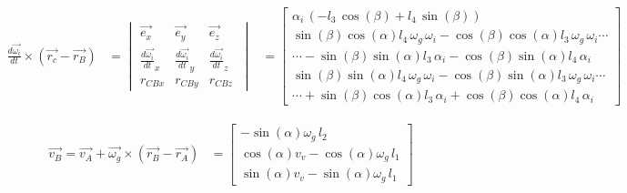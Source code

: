 \begin{equation*}
\begin{split}
\frac{d\overrightarrow{\omega_i}}{dt}\times(\overrightarrow{r_{c}}-\overrightarrow{r_{B}})
&=	\begin{vmatrix}
	\overrightarrow{e_{x}} & \overrightarrow{e_{y}} & \overrightarrow{e_{z}}\\
	\frac{d\overrightarrow{\omega_i}}{dt}_{x} & \frac{d\overrightarrow{\omega_i}}{dt}_{y} & \frac{d\overrightarrow{\omega_i}}{dt}_{z}\\
	r_{CBx} & r_{CBy} & r_{CBz}\
	\end{vmatrix}
&=	\begin{bmatrix}
	\alpha_{i}\, \left( -l_{3}\,\cos \left( \beta \right) +l_{4}\,\sin \left( \beta \right)  \right) \\
	\sin \left( \beta \right) \cos \left( \alpha\right) l_{4}\,\omega_{g}\,\omega_{i}-\cos \left( \beta \right) \cos\left( \alpha \right) l_{3}\,\omega_{g}\,\omega_{i}\cdots\\
	\cdots-\sin \left( \beta\right) \sin \left( \alpha \right) l_{3}\,\alpha_{i}-\cos \left( \beta \right) \sin \left( \alpha \right) l_{4}\,\alpha_{i}\\
	\sin \left( \beta \right) \sin \left( \alpha\right) l_{4}\,\omega_{g}\,\omega_{i}-\cos \left( \beta \right) \sin\left( \alpha \right) l_{3}\,\omega_{g}\,\omega_{i} \cdots\\
	\cdots +\sin \left( \beta\right) \cos \left( \alpha \right) l_{3}\,\alpha_{i}+\cos \left( \beta \right) \cos \left( \alpha \right) l_{4}\,\alpha_{i}\
\end{bmatrix}
\end{split}
\end{equation*}

\begin{equation*}
\begin{split}
\overrightarrow{v_{B}}=\overrightarrow{v_{A}}+\overrightarrow{\omega_{g}}\times(\overrightarrow{r_{B}}-\overrightarrow{r_{A}})
&=	\begin{bmatrix}
	-\sin \left( \alpha \right) \omega_{g}\,l_{2}\\
	\cos \left( \alpha \right) v_{v}-\cos \left( \alpha \right) \omega_{g}\,l_{1}\\
	\sin \left( \alpha \right) v_{v}-\sin \left( \alpha \right) \omega_{g}\,l_{1}\
	\end{bmatrix}
\end{split}
\end{equation*}

